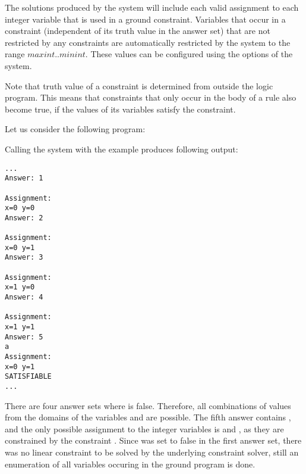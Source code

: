 The solutions produced by the system will include each valid assignment to each integer variable that is
used in a ground constraint.
Variables that occur in a constraint (independent of its truth value in the answer set) that are not
restricted by any constraints are automatically restricted by the system to the range $maxint..minint$.
These values can be configured using the options of the \clingcon{} system.

Note that truth value of a constraint is determined from outside the logic program.
This means that constraints that only occur in the body of a rule also become true,
if the values of its variables satisfy the constraint.

\begin{example}\label{ex:lp:csp2}
Let us consider the following program: 

Calling the system with the example produces following output:
\begin{lstlisting}[numbers=none]
...
Answer: 1

Assignment:
x=0 y=0
Answer: 2

Assignment:
x=0 y=1
Answer: 3

Assignment:
x=1 y=0
Answer: 4

Assignment:
x=1 y=1
Answer: 5
a
Assignment:
x=0 y=1
SATISFIABLE
...
\end{lstlisting}
There are four answer sets where  is false.
Therefore, all combinations of values from the domains of the variables  and  are possible.
The fifth answer contains ,
and the only possible assignment to the integer variables is  and ,
as they are constrained by the constraint .
%
Since  was set to false in the first answer set, 
there was no linear constraint to be solved by the underlying constraint solver, 
still an enumeration of all variables occuring in the ground program is done. 
%
\end{example}

